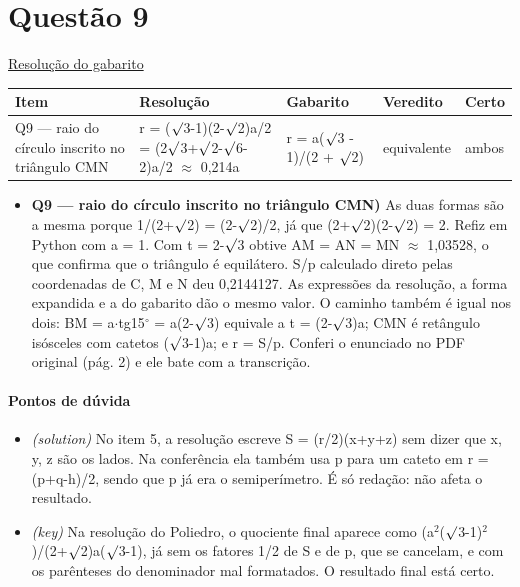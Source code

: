 \documentclass{article}%
\begin{document}
\section*{Questão 9}%
\href{https://poliedroresolve.sistemapoliedro.com.br/vestibulares/ime/2026/ime-2-fase-dia-1-23-10-2025-2-fase-dia-1/dissertativa-9-matematica-2-fase-dia-1-ime-2026}{Resolução do gabarito}\par\smallskip%
\begin{longtable}{@{}p{} p{} p{} p{} p{}@{}}\toprule Item & Resolução & Gabarito & Veredito & Certo \\ \midrule
Q9 --- raio do círculo inscrito no triângulo CMN & r = ($\surd$3-1)(2-$\surd$2)a/2 = (2$\surd$3+$\surd$2-$\surd$6-2)a/2 $\approx$ 0,214a & r = a($\surd$3 - 1)/(2 + $\surd$2) & equivalente & ambos \\
\bottomrule\end{longtable}%
\begin{itemize}%
\item%
\textbf{Q9 --- raio do círculo inscrito no triângulo CMN)} As duas formas são a mesma porque 1/(2+$\surd$2) = (2-$\surd$2)/2, já que (2+$\surd$2)(2-$\surd$2) = 2. Refiz em Python com a = 1. Com t = 2-$\surd$3 obtive AM = AN = MN $\approx$ 1,03528, o que confirma que o triângulo é equilátero. S/p calculado direto pelas coordenadas de C, M e N deu 0,2144127. As expressões da resolução, a forma expandida e a do gabarito dão o mesmo valor. O caminho também é igual nos dois: BM = a$\cdot$tg15$^\circ$ = a(2-$\surd$3) equivale a t = (2-$\surd$3)a; CMN é retângulo isósceles com catetos ($\surd$3-1)a; e r = S/p. Conferi o enunciado no PDF original (pág. 2) e ele bate com a transcrição.%
\end{itemize}%
\paragraph{Pontos de dúvida}%
\begin{itemize}%
\item%
\textit{(solution)} No item 5, a resolução escreve S = (r/2)(x+y+z) sem dizer que x, y, z são os lados. Na conferência ela também usa p para um cateto em r = (p+q-h)/2, sendo que p já era o semiperímetro. É só redação: não afeta o resultado.%
\item%
\textit{(key)} Na resolução do Poliedro, o quociente final aparece como (a$^2$($\surd$3-1)$^2$)/(2+$\surd$2)a($\surd$3-1), já sem os fatores 1/2 de S e de p, que se cancelam, e com os parênteses do denominador mal formatados. O resultado final está certo.%
\end{itemize}%
\end{document}
